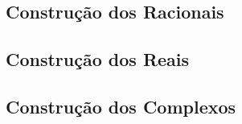 \documentclass[twoside]{amsart}
\numberwithin{equation}{section}
\begin{document}

\begin{refsection}
\section{Construção dos Racionais}

\printbibliography[heading=subbibliography]
\end{refsection}


\begin{refsection}
\section{Construção dos Reais}

\printbibliography[heading=subbibliography]
\end{refsection}


\begin{refsection}
\section{Construção dos Complexos}

\printbibliography[heading=subbibliography]
\end{refsection}

\end{document}
